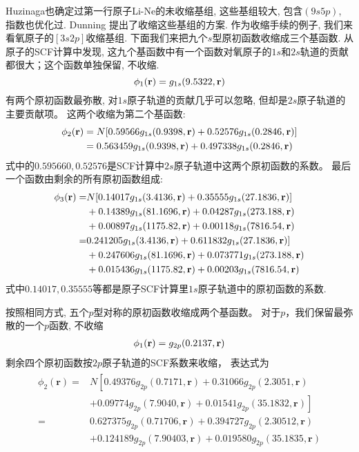 Huzinaga也确定过第一行原子Li-Ne的未收缩基组, 这些基组较大, 包含$(9s5p)$, 指数也优化过. 
Dunning  提出了收缩这些基组的方案. 作为收缩手续的例子, 我们来看氧原子的$[3s2p]$收缩基组. 
下面我们来把九个$s$型原初函数收缩成三个基函数. 
从原子的SCF计算中发现, 这九个基函数中有一个函数对氧原子的$1s$和$2s$轨道的贡献都很大；这个函数单独保留, 不收缩.
\begin{equation}
	\label{3.290}
	\phi_1(\mathbf{r})=g_{1s}(9.5322,\mathbf{r})
\end{equation} 
有两个原初函数最弥散, 
对$1s$原子轨道的贡献几乎可以忽略, 
但却是$2s$原子轨道的主要贡献项。
这两个收缩为第二个基函数:
\begin{align}
	\label{3.291}
	\phi_2(\mathbf{r}) & = N[0.59566g_{1s}(0.9398,\mathbf{r}) + 0.52576 g_{1s}(0.2846,\mathbf{r})]\notag\\
	& = 0.563459 g_{1s}(0.9398,\mathbf{r}) + 0.497338 g_{1s}(0.2846,\mathbf{r})
\end{align}
式中的$0.595660,0.52576$是SCF计算中$2s$原子轨道中这两个原初函数的系数。 
最后一个函数由剩余的所有原初函数组成:
\begin{align}
	\phi_3(\mathbf{r}) = & N[0.14017g_{1s}(3.4136,\mathbf{r}) + 0.35555g_{1s}(27.1836,\mathbf{r})] \notag    \\
	& + 0.14389g_{1s}(81.1696,\mathbf{r}) + 0.04287 g_{1s}(273.188,\mathbf{r}) \notag   \\
	& + 0.00897g_{1s}(1175.82,\mathbf{r}) + 0.00118g_{1s}(7816.54,\mathbf{r}) \notag    \\
	= & 0.241205g_{1s}(3.4136,\mathbf{r}) + 0.611832g_{1s}(27.1836,\mathbf{r})] \notag    \\
	& + 0.247606g_{1s}(81.1696,\mathbf{r}) + 0.073771 g_{1s}(273.188,\mathbf{r}) \notag \\
	& + 0.015436g_{1s}(1175.82,\mathbf{r}) + 0.00203g_{1s}(7816.54,\mathbf{r})
\end{align}
式中$0.14017, 0.35555$等都是原子SCF计算里$1s$原子轨道中的原初函数的系数.


按照相同方式, 
五个$p$型对称的原初函数收缩成两个基函数。
对于$p$，我们保留最弥散的一个$p$函数, 不收缩
\begin{align}
	\phi_1(\mathbf{r}) = g_{2p}(0.2137,\mathbf{r})
\end{align}
剩余四个原初函数按$2p$原子轨道的SCF系数来收缩，
表达式为
\begin{align}
	\begin{aligned}
		\phi_{2}(\mathbf{r})= & N\left[0.49376 g_{2 p}(0.7171, \mathbf{r})+0.31066 g_{2 p}(2.3051, \mathbf{r})\right.  \\
		& \left.+0.09774 g_{2 p}(7.9040, \mathbf{r})+0.01541 g_{2 p}(35.1832, \mathbf{r})\right] \\
		= & 0.627375 g_{2 p}(0.71706, \mathbf{r})+0.394727 g_{2 p}(2.30512, \mathbf{r})            \\
		& +0.124189 g_{2 p}(7.90403, \mathbf{r})+0.019580 g_{2 p}(35.1835, \mathbf{r})
	\end{aligned}
\end{align}

